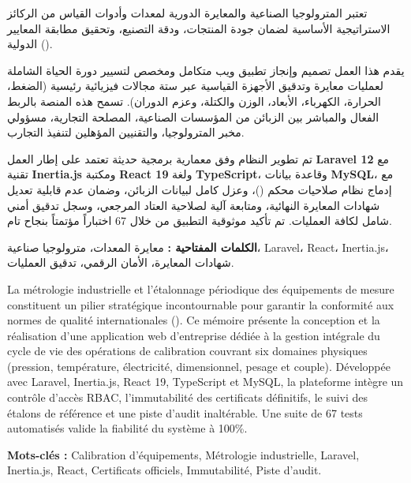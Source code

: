 \documentclass{bts-report-ar}
\begin{document}
\begin{abstractar}
تعتبر المترولوجيا الصناعية والمعايرة الدورية لمعدات وأدوات القياس من الركائز الاستراتيجية الأساسية لضمان جودة المنتجات، ودقة التصنيع، وتحقيق مطابقة المعايير الدولية (). 

يقدم هذا العمل تصميم وإنجاز تطبيق ويب متكامل ومخصص لتسيير دورة الحياة الشاملة لعمليات معايرة وتدقيق الأجهزة القياسية عبر ستة مجالات فيزيائية رئيسية (الضغط، الحرارة، الكهرباء، الأبعاد، الوزن والكتلة، وعزم الدوران). تسمح هذه المنصة بالربط الفعال والمباشر بين الزبائن من المؤسسات الصناعية، المصلحة التجارية، مسؤولي مخبر المترولوجيا، والتقنيين المؤهلين لتنفيذ التجارب. 

تم تطوير النظام وفق معمارية برمجية حديثة تعتمد على إطار العمل \textbf{Laravel 12} مع تقنية \textbf{Inertia.js} ومكتبة \textbf{React 19} ولغة \textbf{TypeScript}، وقاعدة بيانات \textbf{MySQL}، مع إدماج نظام صلاحيات محكم ()، وعزل كامل لبيانات الزبائن، وضمان عدم قابلية تعديل شهادات المعايرة النهائية، ومتابعة آلية لصلاحية العتاد المرجعي، وسجل تدقيق أمني شامل لكافة العمليات. تم تأكيد موثوقية التطبيق من خلال 67 اختباراً مؤتمتاً بنجاح تام.

\vspace{0.6cm}
\noindent\textbf{الكلمات المفتاحية :} معايرة المعدات، مترولوجيا صناعية، Laravel، React، Inertia.js، شهادات المعايرة، الأمان الرقمي، تدقيق العمليات.
\end{abstractar}

\begin{abstractfr}
La m\'etrologie industrielle et l'\'etalonnage p\'eriodique des \'equipements de mesure constituent un pilier strat\'egique incontournable pour garantir la conformit\'e aux normes de qualit\'e internationales (). Ce m\'emoire pr\'esente la conception et la r\'ealisation d'une application web d'entreprise d\'edi\'ee \`a la gestion int\'egrale du cycle de vie des op\'erations de calibration couvrant six domaines physiques (pression, temp\'erature, \'electricit\'e, dimensionnel, pesage et couple). D\'evelopp\'ee avec Laravel, Inertia.js, React 19, TypeScript et MySQL, la plateforme int\`egre un contr\^ole d'acc\`es RBAC, l'immutabilit\'e des certificats d\'efinitifs, le suivi des \'etalons de r\'ef\'erence et une piste d'audit inalt\'erable. Une suite de 67 tests automatis\'es valide la fiabilit\'e du syst\`eme \`a 100\%.

\vspace{0.6cm}
\noindent\textbf{Mots-cl\'es :} Calibration d'\'equipements, M\'etrologie industrielle, Laravel, Inertia.js, React, Certificats officiels, Immutabilit\'e, Piste d'audit.
\end{abstractfr}
\end{document}

